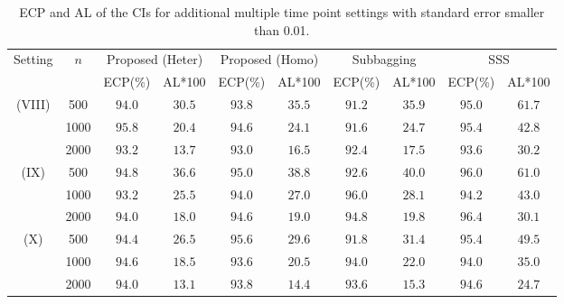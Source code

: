 \documentclass[11pt]{article}
\theoremstyle{referenceplain}
\theoremstyle{referencedefinition}
\theoremstyle{referenceremark}
\begin{document}
\begin{table}[H]
    \centering
    \scriptsize
    \caption{ECP and AL of the CIs for additional multiple time point settings with standard error smaller than 0.01.}
    \begin{tabular}{|c|c|c|c|c|c|c|c|c|c|}
        \hline
        \multirow{2}{*}{Setting} & \multirow{2}{*}{$n$} & \multicolumn{2}{c|}{Proposed (Heter)} & \multicolumn{2}{c|}{Proposed (Homo)} & \multicolumn{2}{c|}{Subbagging} & \multicolumn{2}{c|}{SSS} \\
        \cline{3-10}
        & & ECP(\%) & AL*100 & ECP(\%) & AL*100 & ECP(\%) & AL*100 & ECP(\%) & AL*100 \\
        \hline
        \multirow{3}{*}{(VIII)}
        & 500  & $94.0$ & $30.5$ & $93.8$ & $35.5$ & $91.2$ & $35.9$ & $95.0$ & $61.7$ \\
        & 1000 & $95.8$ & $20.4$ & $94.6$ & $24.1$ & $91.6$ & $24.7$ & $95.4$ & $42.8$ \\
        & 2000 & $93.2$ & $13.7$ & $93.0$ & $16.5$ & $92.4$ & $17.5$ & $93.6$ & $30.2$ \\
        \hline
        \multirow{3}{*}{(IX)}
        & 500  & $94.8$ & $36.6$ & $95.0$ & $38.8$ & $92.6$ & $40.0$ & $96.0$ & $61.0$ \\
        & 1000 & $93.2$ & $25.5$ & $94.0$ & $27.0$ & $96.0$ & $28.1$ & $94.2$ & $43.0$ \\
        & 2000 & $94.0$ & $18.0$ & $94.6$ & $19.0$ & $94.8$ & $19.8$ & $96.4$ & $30.1$ \\
        \hline
        \multirow{3}{*}{(X)}
        & 500  & $94.4$ & $26.5$ & $95.6$ & $29.6$ & $91.8$ & $31.4$ & $95.4$ & $49.5$ \\
        & 1000 & $94.6$ & $18.5$ & $93.6$ & $20.5$ & $94.0$ & $22.0$ & $94.0$ & $35.0$ \\
        & 2000 & $94.0$ & $13.1$ & $93.8$ & $14.4$ & $93.6$ & $15.3$ & $94.6$ & $24.7$ \\
        \hline
    \end{tabular}
    \label{multi-heter-sim}
\end{table}
\end{document}
